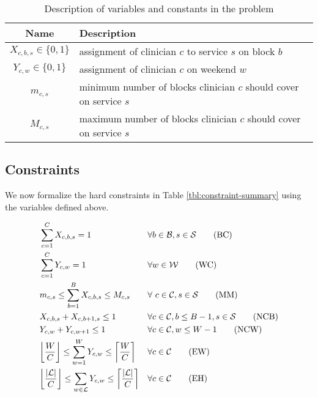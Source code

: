 \begin{table}[h]
	\centering
	\begin{tabular}{ c l }
		\hline
		\textbf{Name}              & \textbf{Description}                                               \\ \hline
		$X_{c, b, s} \in \{0, 1\}$ & assignment of clinician $c$ to service $s$ on block $b$            \\
		$Y_{c, w} \in \{0, 1\}$    & assignment of clinician $c$ on weekend $w$                         \\
		$m_{c, s}$                 & minimum number of blocks clinician $c$ should cover on service $s$ \\
		$M_{c, s}$                 & maximum number of blocks clinician $c$ should cover on service $s$
	\end{tabular}
	\caption{Description of variables and constants in the problem}
	\label{tbl:variables-constants}
\end{table}

\subsection{Constraints} \label{sec:meth-constraints}
We now formalize the hard constraints in Table \ref{tbl:constraint-summary} using the variables defined above.

\begin{align}
	&\sum_{c=1}^{C} X_{c, b, s} = 1 &&\forall b\in \mathcal{B}, s \in \mathcal{S} \tag{BC} \label{eqn:constr-block-cov} \\
	&\sum_{c=1}^{C} Y_{c, w} = 1 &&\forall w\in \mathcal{W} \tag{WC} \label{eqn:constr-weekend-cov} \\
	&m_{c, s} \leq \sum_{b=1}^{B} X_{c, b, s} \leq M_{c, s} &&\forall\ c\in\mathcal{C}, s\in\mathcal{S} \tag{MM} \label{eqn:constr-min-max} \\
	&X_{c, b, s} + X_{c, b + 1, s} \leq 1 &&\forall c\in\mathcal{C}, b \leq B - 1, s\in\mathcal{S} \tag{NCB} \label{eqn:constr-no-consec-blocks} \\
	&Y_{c, w} + Y_{c, w + 1} \leq 1 &&\forall c\in\mathcal{C}, w \leq W - 1 \tag{NCW} \label{eqn:constr-no-consec-weekends} \\
	&\floor*{\frac{W}{C}} \leq \sum_{w=1}^W Y_{c, w} \leq \ceil*{\frac{W}{C}} &&\forall c\in\mathcal{C} \tag{EW} \label{eqn:constr-equal-weekends} \\
	&\floor*{\frac{\abs{\mathcal{L}}}{C}} \leq \sum_{w\in\mathcal{L}} Y_{c, w} \leq \ceil*{\frac{\abs{\mathcal{L}}}{C}} &&\forall c\in\mathcal{C} \tag{EH} \label{eqn:constr-equal-holidays}
\end{align}

